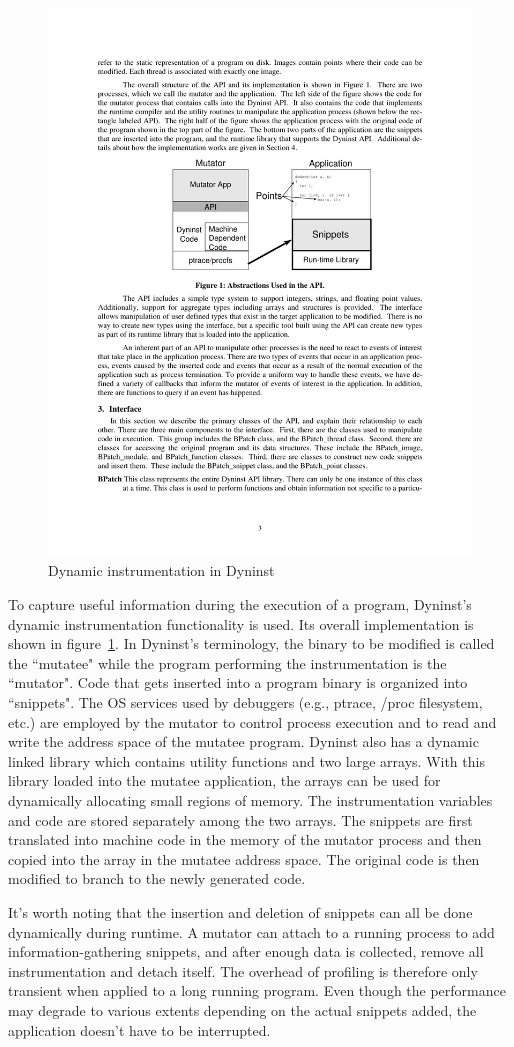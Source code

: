 \begin{figure}[htp]
\begin{center}
\includegraphics[width=0.6\linewidth]{chap6fig/dyninst.pdf}
\caption{Dynamic instrumentation in Dyninst~\cite{Buck:2000:ARC:1080622.1080630}
\label{dyninstAPIPic}}
\end{center}
\end{figure}


To capture useful information during the execution of a program, Dyninst's dynamic instrumentation functionality is used. Its overall implementation is shown
in figure~\ref{dyninstAPIPic}. 
In Dyninst's terminology, the binary to be modified is called the ``mutatee" while the program performing the instrumentation is the ``mutator". Code that gets inserted
into a program binary is organized into ``snippets".
The OS services used by debuggers (e.g., ptrace, /proc filesystem, etc.) are employed by the mutator to control process execution and to read and write the
address space of the mutatee program. Dyninst also has a dynamic linked library
which contains utility functions and two large arrays. With this library loaded
into the mutatee application, the arrays can be used for dynamically allocating small regions of memory. The instrumentation variables and code are stored separately among the two arrays. The snippets are first translated into machine code in the memory of the mutator process and then copied into the array in the mutatee address space. The original code is then modified to branch to the newly generated code. 

It's worth noting that the insertion and deletion
of snippets can all be done dynamically during runtime. A mutator can attach to a running process to add information-gathering snippets, and after enough data is collected, remove all instrumentation and detach itself.
The overhead of profiling is therefore only transient when applied to a long running program. Even though the performance may degrade to various extents depending on the actual snippets added, the application doesn't have to be interrupted.

